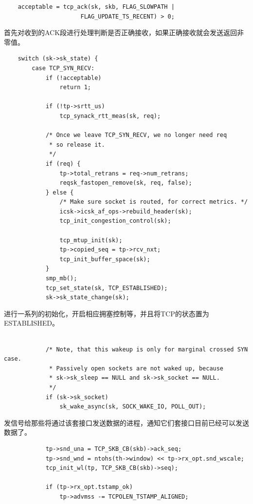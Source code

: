 \begin{verbatim}
    acceptable = tcp_ack(sk, skb, FLAG_SLOWPATH |
                      FLAG_UPDATE_TS_RECENT) > 0;
\end{verbatim}

    首先对收到的ACK段进行处理判断是否正确接收，如果正确接收就会发送返回非零值。

\begin{verbatim}
    switch (sk->sk_state) {
        case TCP_SYN_RECV:
            if (!acceptable)
                return 1;

            if (!tp->srtt_us)
                tcp_synack_rtt_meas(sk, req);

            /* Once we leave TCP_SYN_RECV, we no longer need req
             * so release it.
             */
            if (req) {
                tp->total_retrans = req->num_retrans;
                reqsk_fastopen_remove(sk, req, false);
            } else {
                /* Make sure socket is routed, for correct metrics. */
                icsk->icsk_af_ops->rebuild_header(sk);
                tcp_init_congestion_control(sk);

                tcp_mtup_init(sk);
                tp->copied_seq = tp->rcv_nxt;
                tcp_init_buffer_space(sk);
            }
            smp_mb();
            tcp_set_state(sk, TCP_ESTABLISHED);
            sk->sk_state_change(sk);
\end{verbatim}

    进行一系列的初始化，开启相应拥塞控制等，并且将TCP的状态置为ESTABLISHED。

\begin{verbatim}

            /* Note, that this wakeup is only for marginal crossed SYN case.
             * Passively open sockets are not waked up, because
             * sk->sk_sleep == NULL and sk->sk_socket == NULL.
             */
            if (sk->sk_socket)
                sk_wake_async(sk, SOCK_WAKE_IO, POLL_OUT);
\end{verbatim}

    发信号给那些将通过该套接口发送数据的进程，通知它们套接口目前已经可以发送数据了。

\begin{verbatim}
            tp->snd_una = TCP_SKB_CB(skb)->ack_seq;
            tp->snd_wnd = ntohs(th->window) << tp->rx_opt.snd_wscale;
            tcp_init_wl(tp, TCP_SKB_CB(skb)->seq);

            if (tp->rx_opt.tstamp_ok)
                tp->advmss -= TCPOLEN_TSTAMP_ALIGNED;
\end{verbatim}

